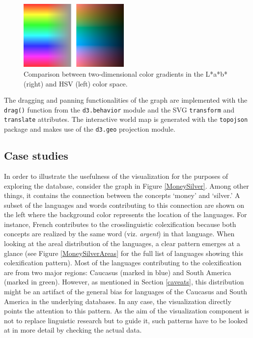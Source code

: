\begin{figure}[h]
    \centering
   \includegraphics[width=0.48\textwidth]{img/Lab_HSV2.png}
    \caption{Comparison between two-dimensional color gradients in the L*a*b* (right) and HSV (left)
    color space.}
    \label{lab vs hsv}
\end{figure}


The  dragging and panning functionalities of the graph are implemented with the \texttt{drag()} function from the \texttt{d3.behavior} module and the SVG \texttt{transform} and \texttt{translate} attributes. The interactive world map is generated with the \texttt{topojson} package and makes use of the \texttt{d3.geo} projection module.

\subsection{Case studies} \label{case study}

In order to illustrate the usefulness of the visualization for the purposes of exploring the database, consider the graph in Figure \ref{MoneySilver}. Among other things, it contains the connection between the concepts `money' and `silver.' A subset of the languages and words contributing to this connection are shown on the left where the background color represents the location of the languages. For instance, French contributes to the crosslinguistic colexification because both concepts are realized by the same word (viz. \textit{argent}) in that language. When looking at the areal distribution of the languages, a clear pattern emerges at a glance (see Figure \ref{MoneySilverAreas} for the full list of languages showing this colexification pattern). Most of the languages contributing to the colexification are from two major regions: Caucasus (marked in blue) and South America (marked in green). However, as mentioned in Section \ref{caveats}, this distribution might be an artifact of the general bias for languages of the Caucasus and South America in the underlying databases. In any case, the visualization directly points the attention to this pattern. As the  aim of the visualization component is not to replace linguistic research but to guide it, such patterns have to be looked at in more detail by checking the actual data. 

